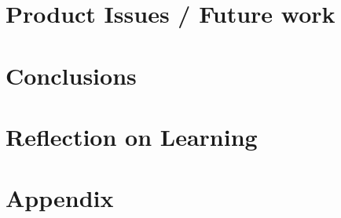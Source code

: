 \documentclass[12pt, conference, final, a4paper, onecolumn, compsoc]{IEEEtran}
\begin{document}
    \section{Product Issues / Future work} %
    \subsection*{}

    \section{Conclusions}
    \subsection*{}

    \section{Reflection on Learning} %
    \subsection*{}

    \section{Appendix}
     

  
\end{document}
